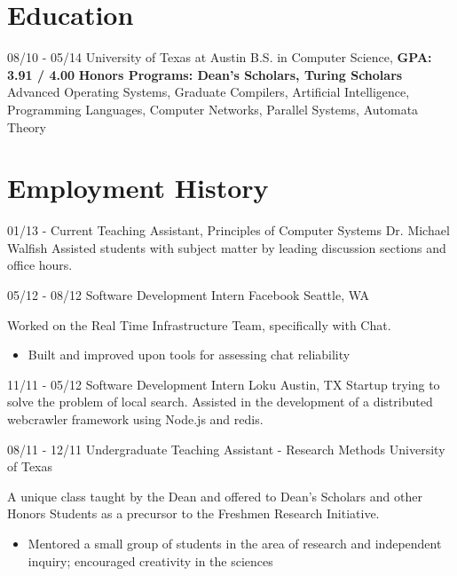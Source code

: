 \documentclass[11pt,letter,sans]{moderncv}
\begin{document}
\maketitle

\section{Education}
\cventry
{08/10 - 05/14}
{University of Texas at Austin}
{B.S. in Computer Science, \textbf{GPA: 3.91 / 4.00}}
{}
{}
{\textbf{Honors Programs: Dean's Scholars, Turing Scholars}}
{Advanced Operating Systems, Graduate Compilers, Artificial Intelligence,
Programming Languages, Computer Networks, Parallel Systems, Automata Theory}

\section{Employment History}
\cventry
{01/13 - Current}
{Teaching Assistant, Principles of Computer Systems}
{Dr. Michael Walfish}
{}
{}
{Assisted students with subject matter by leading discussion sections and
office hours.}

\cventry
{05/12 - 08/12}
{Software Development Intern}
{Facebook}
{Seattle, WA}
{}
{Worked on the Real Time Infrastructure Team, specifically with Chat.
  \begin{itemize}
    \item Built and improved upon tools for assessing chat reliability
\end{itemize}}

\cventry
{11/11 - 05/12}
{Software Development Intern}
{Loku}
{Austin, TX}
{}
{Startup trying to solve the problem of local search. Assisted in the
development of a distributed webcrawler framework using Node.js and redis.}

\cventry
{08/11 - 12/11}
{Undergraduate Teaching Assistant - Research Methods}
{University of Texas}
{}
{}
{A unique class taught by the Dean and offered to Dean's Scholars and other
  Honors Students as a precursor to the Freshmen Research Initiative.
  \begin{itemize}
    \item Mentored a small group of students in the area of research and
      independent inquiry; encouraged creativity in the sciences
\end{itemize}}
\end{document}
